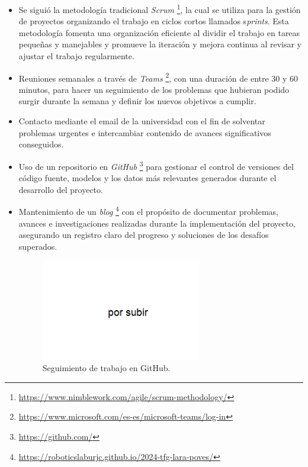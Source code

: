 \begin{itemize}
       \item Se siguió la metodología tradicional \textit{Scrum} \footnote{\url{https://www.nimblework.com/agile/scrum-methodology/}}, la cual se utiliza para la gestión de proyectos organizando el trabajo en ciclos cortos llamados s\textit{prints}. Esta metodología fomenta una organización eficiente al dividir el trabajo en tareas pequeñas y manejables y promueve la iteración y mejora continua al revisar y ajustar el trabajo regularmente.
    \item Reuniones semanales a través de \textit{Teams} \footnote{\url{https://www.microsoft.com/es-es/microsoft-teams/log-in}}, con una duración de entre 30 y 60 minutos, para hacer un seguimiento de los problemas que hubieran podido surgir durante la semana y definir los nuevos objetivos a cumplir.
    \item Contacto mediante el email de la universidad con el fin de solventar problemas urgentes e intercambiar contenido de avances significativos conseguidos.
    \item Uso de un repositorio en \textit{GitHub}  \footnote{\url{https://github.com/}} para gestionar el control de versiones del código fuente, modelos y los datos más relevantes generados durante el desarrollo del proyecto.
    \item Mantenimiento de un \textit{blog} \footnote{\url{https://roboticslaburjc.github.io/2024-tfg-lara-poves/}} con el propósito de documentar problemas, avances e investigaciones realizadas durante la implementación del proyecto, asegurando un registro claro del progreso y soluciones de los desafíos superados.

	\begin{figure}[ht]
	  \begin{center}
	    \includegraphics[width=7cm]{figs/objetivos/github.png}
	  \end{center}
	  \caption{Seguimiento de trabajo en GitHub.}
	  \label{github}
	\end{figure}

\end{itemize}

